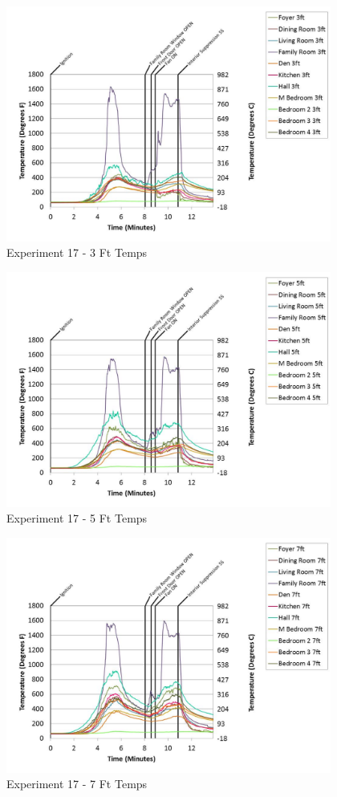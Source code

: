 \documentclass{article}
\begin{document}
\begin{appendices}
	\begin{figure}[h!]
		\centering
		\includegraphics[height=3.05in]{0_Images/Results_Charts/Exp_17_Charts/3FtTemps.pdf}
		\caption{Experiment 17 - 3 Ft Temps}
	\end{figure}
 
	\clearpage

	\begin{figure}[h!]
		\centering
		\includegraphics[height=3.05in]{0_Images/Results_Charts/Exp_17_Charts/5FtTemps.pdf}
		\caption{Experiment 17 - 5 Ft Temps}
	\end{figure}
 

	\begin{figure}[h!]
		\centering
		\includegraphics[height=3.05in]{0_Images/Results_Charts/Exp_17_Charts/7FtTemps.pdf}
		\caption{Experiment 17 - 7 Ft Temps}
	\end{figure}
 

\end{appendices}
\end{document}
